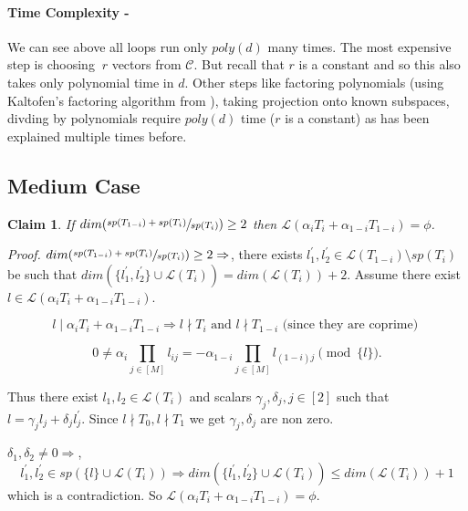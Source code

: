 \documentclass[letterpaper,USenglish,numberwithinsect]{lipics}
\newcommand{\ML}{\mathcal{L}}
\newcommand{\MC}{\mathcal{C}}
\newtheorem{claim}[theorem]{Claim}
\begin{document}
\paragraph{Time Complexity - }
We can see above all loops run only $poly(d)$ many times. The most expensive step is choosing
$~ r$ vectors from $\MC$. But recall that $r$ is a constant and so this also takes only polynomial time in $d$.
Other steps like factoring polynomials (using Kaltofen's factoring algorithm from \cite{KalTr90}), taking projection onto known subspaces, divding
by polynomials require $poly(d)$ time ($r$ is a constant) as has been explained multiple times before.\\




\subsection{Medium Case} \label{mediumcase}

\begin{center}
\end{center}



\begin{claim}
If $dim(\sfrac{sp(T_{1-i}) + sp(T_i)}{sp(T_i)} )\geq 2$ then
$\ML(\alpha_iT_i+\alpha_{1-i}T_{1-i})=\phi$.
\end{claim}
\emph{Proof.}
 $dim(\sfrac{sp(T_{1-i}) + sp(T_i)}{sp(T_i)} )\geq 2\Rightarrow$, there exists $l_1^\prime,l_2^\prime\in \ML(T_{1-i})\setminus sp(T_{i})$ be
such that $dim(\{l_1^\prime,l_2^\prime\}\cup \ML(T_{i}))= dim(\ML(T_{i}))+2$.
Assume there
 exist $l\in \ML(\alpha_iT_i+ \alpha_{1-i}T_{1-i})$.

 \[
 l \mid \alpha_iT_i+ \alpha_{1-i}T_{1-i} \Rightarrow  l \nmid T_i \text{ and }
l\nmid T_{1-i} \text{ (since they are coprime) }
 \]

\[
0\neq \alpha_i\prod\limits_{j\in[M]}l_{ij} =
-\alpha_{1-i}\prod\limits_{j\in[M]}l_{(1-i)j} \pmod{\{l\}}.
 \]

 Thus there exist $l_1,l_2\in \ML(T_i)$ and scalars $\gamma_j,\delta_j, j\in [2]$ such that $l = \gamma_j l_{j} + \delta_j l_{j}^\prime$.
 Since $l\nmid T_0,l\nmid T_1$ we get $\gamma_j,\delta_j$ are non zero.

$\delta_1,\delta_2\neq 0 \Rightarrow$,
\[
l_1^\prime,l_2^\prime\in sp(\{l\}\cup \ML(T_{i}))\Rightarrow
dim(\{l_1^\prime,l_2^\prime\}\cup \ML(T_{i})) \leq dim(\ML(T_{i}))+1
 \]
 which is a contradiction.
So $\ML(\alpha_iT_i+ \alpha_{1-i}T_{1-i})=\phi$. \
\end{document}
